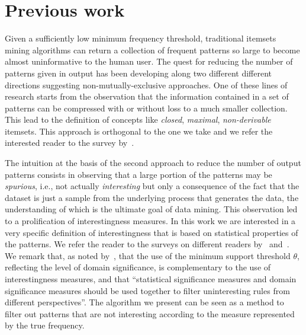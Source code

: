 \section{Previous work}\label{sec:prevwork}
Given a sufficiently low minimum frequency threshold, traditional itemsets
mining algorithms can return a collection of frequent patterns so large to
become almost uninformative to the human user. The quest for reducing the number
of patterns given in output has been developing along two different different
directions suggesting non-mutually-exclusive approaches. One of these lines of
research starts from the observation that the information contained in a
set of patterns can be compressed with or without loss to a much smaller
collection. This lead to the definition of concepts like \emph{closed},
\emph{maximal}, \emph{non-derivable} itemsets. This approach is orthogonal to
the one we take and we refer the interested reader to the survey by~\citet{CaldersRB06}.

The intuition at the basis of the second approach to reduce the number of output
patterns consists in observing that a large portion of the patterns may be
\emph{spurious}, i.e., not actually \emph{interesting} but only a consequence of
the fact that the dataset is just a sample from the underlying process that
generates the data, the understanding of which is the ultimate goal of data
mining. This observation led to a prolification of interestingness measures. In
this work we are interested in a very specific definition of interestingness
that is based on statistical properties of the patterns. We refer the reader to
the surveys on different readers by~\citet[Sect.~3]{HanCXY07}
and~\citet{GengH06}.  We remark that, as noted by~\citet{LiuZW11}, that the use
of the minimum support threshold $\theta$, reflecting the level of domain
significance, is complementary to the use of interestingness measures, and that
``statistical significance measures and domain significance measures should be
used together to filter uninteresting rules from different perspectives''. The
algorithm we present can be seen as a method to filter out patterns that are not
interesting according to the measure represented by the true frequency.

